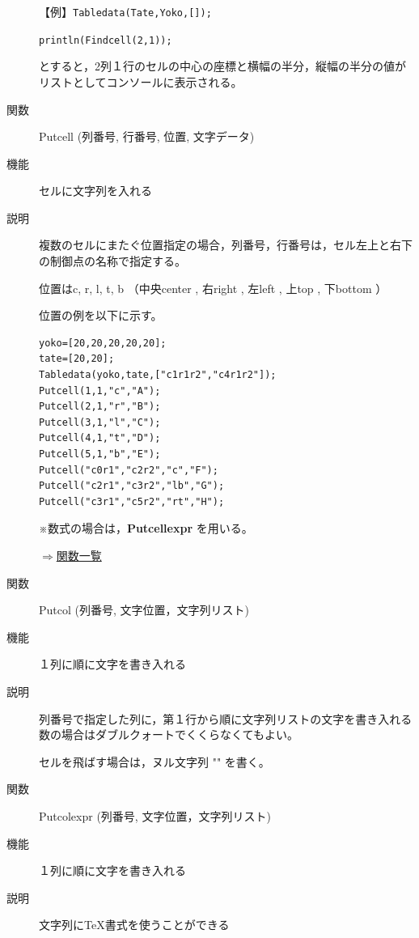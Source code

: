 \documentclass[papersize,a4paper,10pt,uplatex]{jsarticle}
\begin{document}
\begin{description}
\vspace{\baselineskip}
【例】\verb|Tabledata(Tate,Yoko,[]);|

\verb|println(Findcell(2,1));|

とすると，2列１行のセルの中心の座標と横幅の半分，縦幅の半分の値がリストとしてコンソールに表示される。

\vspace{\baselineskip}
\hypertarget{putcell}{}
\item[関数]Putcell (列番号, 行番号, 位置, 文字データ)
\item[機能]セルに文字列を入れる
\item[説明]複数のセルにまたぐ位置指定の場合，列番号，行番号は，セル左上と右下の制御点の名称で指定する。

位置はc, r, l, t, b （中央center , 右right , 左left , 上top , 下bottom ）

位置の例を以下に示す。
\begin{verbatim}
yoko=[20,20,20,20,20];
tate=[20,20];
Tabledata(yoko,tate,["c1r1r2","c4r1r2"]);
Putcell(1,1,"c","A");
Putcell(2,1,"r","B");
Putcell(3,1,"l","C");
Putcell(4,1,"t","D");
Putcell(5,1,"b","E");
Putcell("c0r1","c2r2","c","F");
Putcell("c2r1","c3r2","lb","G");
Putcell("c3r1","c5r2","rt","H");
\end{verbatim}
\vspace{\baselineskip}
\begin{center}  \end{center}

※数式の場合は，{\bf Putcellexpr} を用いる。

\begin{flushright}\hyperlink{functionlist}{$\Rightarrow$関数一覧}\end{flushright}

\vspace{\baselineskip}
\hypertarget{putcol}{}
\item[関数]Putcol (列番号, 文字位置，文字列リスト)
\item[機能]１列に順に文字を書き入れる
\item[説明]列番号で指定した列に，第１行から順に文字列リストの文字を書き入れる\\
数の場合はダブルクォートでくくらなくてもよい。

セルを飛ばす場合は，ヌル文字列 "" を書く。

\vspace{\baselineskip}
\hypertarget{putcolexpr}{}
\item[関数]Putcolexpr (列番号, 文字位置，文字列リスト)
\item[機能]１列に順に文字を書き入れる
\item[説明]文字列に\TeX 書式を使うことができる


\end{description}
\end{document}
